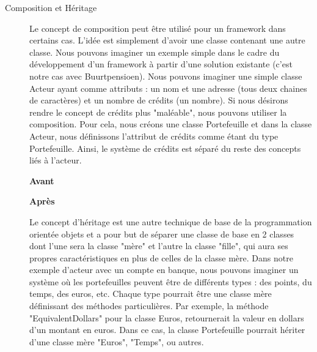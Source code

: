 \begin{description}

\item[Composition et Héritage]
Le concept de composition peut être utilisé pour un framework dans certains cas.  L'idée est simplement d'avoir une classe contenant une autre classe.  Nous pouvons imaginer un exemple simple dans le cadre du développement d'un framework à partir d'une solution existante (c'est notre cas avec Buurtpensioen).  Nous pouvons imaginer une simple classe Acteur ayant comme attributs : un nom et  une adresse (tous deux chaines de caractères) et un nombre de crédits (un nombre).  Si nous désirons rendre le concept de crédits plus "maléable",  nous pouvons utiliser la composition.  Pour cela,  nous créons une classe Portefeuille et dans la classe Acteur,  nous définissons l'attribut de crédits comme étant du type Portefeuille.  Ainsi,  le système de crédits est séparé du reste des concepts liés à l'acteur.  

\begin{minipage}{.5\textwidth}
\begin{center} \textbf{Avant}


\end{center}
\end{minipage}
\hspace{0.3cm}
\begin{minipage}{.5\textwidth}
\begin{center} \textbf{Après}\end{center}


\end{minipage}
\vspace{0.3cm}

Le concept d'héritage est une autre technique de base de la programmation orientée objets et a pour but de séparer une classe de base en 2 classes dont l'une sera la classe "mère" et l'autre la classe "fille",  qui aura ses propres caractéristiques en plus de celles de la classe mère.  Dans notre exemple d'acteur avec un compte en banque,  nous pouvons imaginer un système où les portefeuilles peuvent être de différents types : des points,  du temps,  des euros,  etc.  Chaque type pourrait être une classe mère définissant des méthodes particulières.  Par exemple,  la méthode "EquivalentDollars" pour la classe Euros,  retournerait la valeur en dollars d'un montant en euros.  Dans ce cas,  la classe Portefeuille pourrait hériter d'une classe mère "Euros",  "Temps",  ou autres.   


\end{description}
